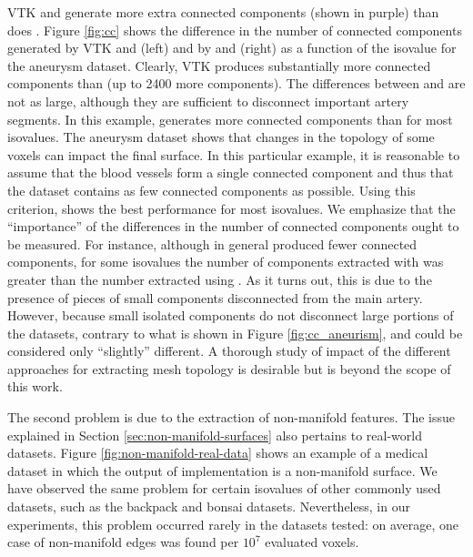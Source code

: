 VTK and \mc{}  generate more extra connected components (shown in purple) than does \cmc. Figure \ref{fig:cc} shows the difference in the number of connected components generated by VTK and \cmc{} (left) and by \mc{} and \cmc{} (right) as a function of the isovalue for the aneurysm dataset. 
%
Clearly, VTK produces substantially more connected components than  \cmc{}  (up to 2400 more components).  The differences between \mc{} and \cmc{} are not as large, although they are sufficient to disconnect important artery segments. In this example, \mc{} generates more  connected components than \cmc{} for most isovalues. 
%
The aneurysm dataset shows that  changes in the topology of some voxels can impact the final surface. 
%
In this particular example, it is reasonable to assume that the blood vessels  form a single connected component and thus that the dataset contains as few connected components as possible. Using this criterion, \cmc{} shows the best performance for most isovalues. 
%
We emphasize that the ``importance'' of the differences in the number of connected components ought to be measured. For instance, although in general \cmc{} produced fewer connected components, for some isovalues the number of components extracted with \cmc{} was greater than the number extracted using \mc{}. As it turns out, this is due to the presence of pieces of small components disconnected from the main artery. However, because small isolated components do not disconnect large portions of the datasets, contrary to what is shown in Figure \ref{fig:cc_aneurism},  \mc{} and \cmc{} could be considered only ``slightly'' different. A thorough study of impact of the different approaches for extracting mesh topology is desirable but is beyond the scope of this work.

The second problem is due to the extraction of non-manifold features. The issue explained in Section \ref{sec:non-manifold-surfaces} also pertains to real-world datasets.  Figure \ref{fig:non-manifold-real-data} shows an example of a medical dataset in which the output of \mc{} implementation is a non-manifold surface. We have observed the same problem for certain isovalues of other commonly used datasets, such as the backpack and bonsai datasets. Nevertheless, in our experiments, this problem occurred  rarely in the datasets tested:  on average, one case of non-manifold edges was found per $10^7$ evaluated voxels.

